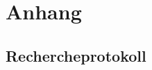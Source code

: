 \chapter{Anhang}
\label{chap:anhang}



\section{Rechercheprotokoll}
\label{sec:rechercheprotokoll}

